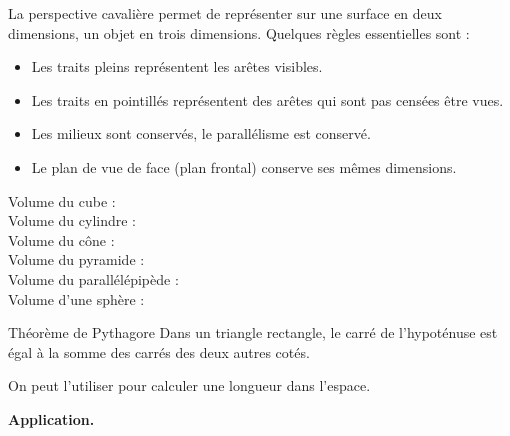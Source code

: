 \documentclass[openany]{book}
\begin{document}




La perspective cavalière permet de représenter sur une surface en deux dimensions, un objet en trois dimensions. Quelques règles essentielles sont :
\begin{itemize}
\item Les traits pleins représentent les arêtes visibles.
\item Les traits en pointillés représentent des arêtes qui sont pas censées être vues. 
\item Les milieux sont conservés, le parallélisme est conservé.
\item Le plan de vue de face (plan frontal) conserve ses mêmes dimensions.
\end{itemize}





\begin{description}
\item[Volume du cube :]   \vplus
\item[Volume du cylindre :]  \vplus
\item[Volume du cône :]   \vplus

\item[Volume du pyramide :]   \vplus
\item[Volume du parallélépipède :]   \vplus
\item[Volume d'une sphère :]   \vplus
\end{description} 







\begin{ThT}{Théorème de Pythagore}
Dans un triangle rectangle, le carré de l'hypoténuse est égal à la somme des carrés des deux autres cotés.
\end{ThT}

On peut l'utiliser pour calculer une longueur dans l'espace.

 \vspace{1cm} 
 
\textbf{Application.}
\end{document}
